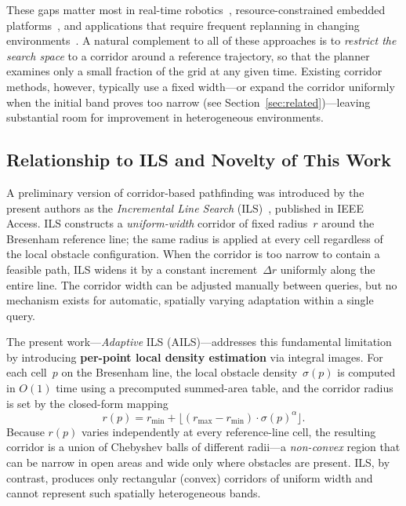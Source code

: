 \documentclass[journal]{IEEEtran}
\begin{document}
These gaps matter most in real-time robotics~\cite{liu2024hybrid,pmc2025review}, resource-constrained embedded platforms~\cite{chen2024safety}, and applications that require frequent replanning in changing environments~\cite{koenig2004lifelong,nair2024robust}.
A natural complement to all of these approaches is to \emph{restrict the search space} to a corridor around a reference trajectory, so that the planner examines only a small fraction of the grid at any given time.
Existing corridor methods, however, typically use a fixed width---or expand the corridor uniformly when the initial band proves too narrow (see Section~\ref{sec:related})---leaving substantial room for improvement in heterogeneous environments.

\subsection{Relationship to ILS and Novelty of This Work}
\label{sec:ils_novelty}

A preliminary version of corridor-based pathfinding was introduced by the present authors as the \emph{Incremental Line Search} (ILS)~\cite{elshahed2025ils}, published in IEEE Access.
ILS constructs a \emph{uniform-width} corridor of fixed radius~$r$ around the Bresenham reference line; the same radius is applied at every cell regardless of the local obstacle configuration.
When the corridor is too narrow to contain a feasible path, ILS widens it by a constant increment~$\Delta r$ uniformly along the entire line.
The corridor width can be adjusted manually between queries, but no mechanism exists for automatic, spatially varying adaptation within a single query.

The present work---\emph{Adaptive} ILS (AILS)---addresses this fundamental limitation by introducing \textbf{per-point local density estimation} via integral images.
For each cell~$p$ on the Bresenham line, the local obstacle density~$\sigma(p)$ is computed in $O(1)$ time using a precomputed summed-area table, and the corridor radius is set by the closed-form mapping
\begin{equation}
    r(p) = r_{\min} + \bigl\lfloor (r_{\max} - r_{\min}) \cdot \sigma(p)^{\alpha} \bigr\rfloor.
    \label{eq:radius_intro}
\end{equation}
Because $r(p)$ varies independently at every reference-line cell, the resulting corridor is a union of Chebyshev balls of different radii---a \emph{non-convex} region that can be narrow in open areas and wide only where obstacles are present.
ILS, by contrast, produces only rectangular (convex) corridors of uniform width and cannot represent such spatially heterogeneous bands.
\end{document}
